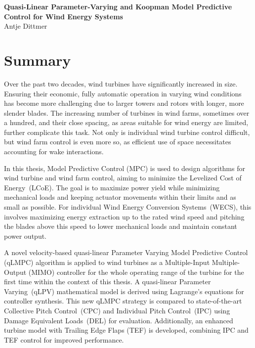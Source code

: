\documentclass[11pt,a4paper]{article}
\begin{document}
    
    \begin{center}
        {\Large \textbf{Quasi-Linear Parameter-Varying and Koopman Model Predictive Control for Wind Energy Systems}}\\[0.5cm]
        Antje Dittmer
    \end{center}
    
    \section*{Summary}
    
        Over the past two decades, wind turbines have significantly increased in size. Ensuring their economic, fully automatic operation in varying wind conditions has become more challenging due to larger towers and rotors with longer, more slender blades. The increasing number of turbines in wind farms, sometimes over a hundred, and their close spacing, as areas suitable for wind energy are limited, further complicate this task. Not only is individual wind turbine control difficult, but wind farm control is even more so, as efficient use of space necessitates accounting for wake interactions.
   
   In this thesis, Model Predictive Control (MPC) is used to design algorithms for wind turbine and wind farm control, aiming to minimize the Levelized Cost of Energy~(LCoE). The goal is to maximize power yield while minimizing mechanical loads and keeping actuator movements within their limits and as small as possible. For individual Wind Energy Conversion Systems~(WECS), this involves maximizing energy extraction up to the rated wind speed and pitching the blades above this speed to lower mechanical loads and maintain constant power output.
   
   A novel velocity-based quasi-linear Parameter Varying Model Predictive Control (qLMPC) algorithm is applied to wind turbines as a Multiple-Input Multiple-Output (MIMO) controller for the whole operating range of the turbine for the first time within the context of this thesis. A quasi-linear Parameter Varying~(qLPV) mathematical model is derived using Lagrange's equations for controller synthesis. This new qLMPC strategy is compared to state-of-the-art Collective Pitch Control~(CPC) and Individual Pitch Control~(IPC) using Damage Equivalent Loads~(DEL) for evaluation. Additionally, an enhanced turbine model with Trailing Edge Flaps (TEF) is developed, combining IPC and TEF control for improved performance.
   
\end{document}
